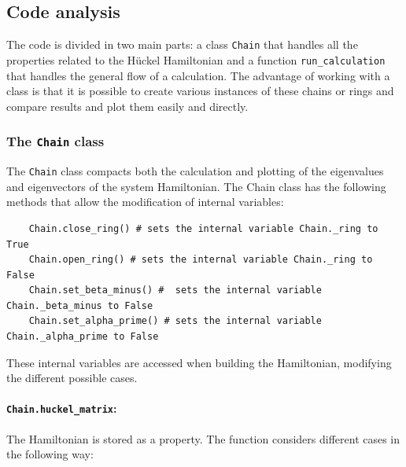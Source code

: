 \documentclass{article}
\begin{document}
\subsection{Code analysis}
The code is divided in two main parts: a class \texttt{Chain} that handles all the properties related to the Hückel Hamiltonian and a function \texttt{run\_calculation} that handles the general flow of a calculation. The advantage of working with a class is that it is possible to create various instances of these chains or rings and compare results and plot them easily and directly. 

\subsubsection{The \texttt{Chain} class}
The \texttt{Chain} class compacts both the calculation and plotting of the eigenvalues and eigenvectors of the system Hamiltonian. The Chain class has the following methods that allow the modification of internal variables:
\begin{lstlisting}
    Chain.close_ring() # sets the internal variable Chain._ring to True
    Chain.open_ring() # sets the internal variable Chain._ring to False
    Chain.set_beta_minus() #  sets the internal variable Chain._beta_minus to False
    Chain.set_alpha_prime() # sets the internal variable Chain._alpha_prime to False
\end{lstlisting} 
These internal variables are accessed when building the Hamiltonian, modifying the different possible cases. 

\paragraph{\texttt{Chain.huckel\_matrix}:}
The Hamiltonian is stored as a property. The function considers different cases in the following way:
\end{document}
